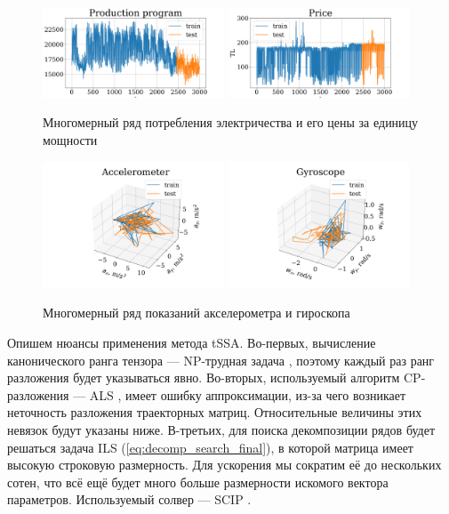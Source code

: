 			\begin{figure}[h]
				\centering
				\includegraphics[width=0.48\textwidth, keepaspectratio]{../figs/Electricity_Production}
				\includegraphics[width=0.48\textwidth, keepaspectratio]{../figs/Electricity_Price}
				\caption{Многомерный ряд потребления электричества и его цены за единицу мощности}\label{fig:electr_data}
			\end{figure}
			
			\begin{figure}[h]
				\centering
				\includegraphics[width=0.48\textwidth, keepaspectratio]{../figs/acceleromter_1.png}
				\includegraphics[width=0.48\textwidth, keepaspectratio]{../figs/gyro_1.png}
				\caption{Многомерный ряд показаний акселерометра и гироскопа}\label{fig:motion_data}
			\end{figure}
			
			Опишем нюансы применения метода tSSA. Во-первых, вычисление канонического ранга тензора --- NP-трудная задача \cite{HASTAD1990644}, поэтому каждый раз ранг разложения будет указываться явно. Во-вторых, используемый алгоритм CP-разложения --- ALS \cite{kolda_tensors}, имеет ошибку аппроксимации, из-за чего возникает неточность разложения траекторных матриц. Относительные величины этих невязок будут указаны ниже. В-третьих, для поиска декомпозиции рядов будет решаться задача ILS (\ref{eq:decomp_search_final}), в которой матрица имеет высокую строковую размерность. Для ускорения мы сократим её до нескольких сотен, что всё ещё будет много больше размерности искомого вектора параметров. Используемый солвер --- SCIP \cite{BolusaniEtal2024ZR}.
			
